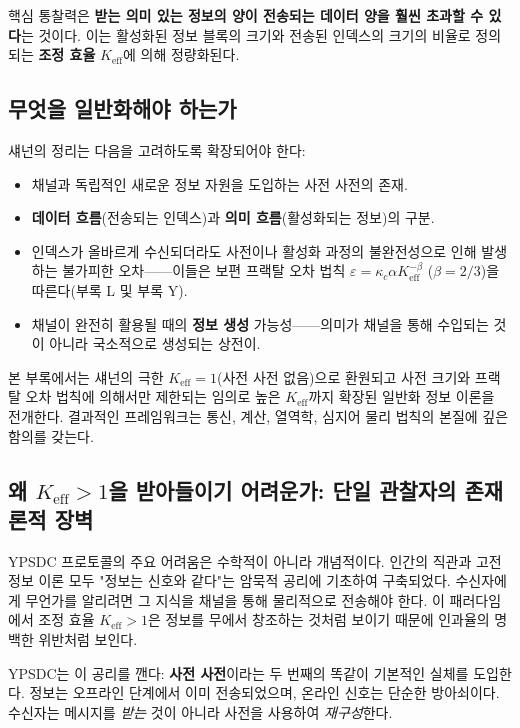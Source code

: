 \documentclass[12pt,a4paper]{article}
\newcommand{\Keff}{K_{\mathrm{eff}}}
\begin{document}
	핵심 통찰력은 \textbf{받는 의미 있는 정보의 양이 전송되는 데이터 양을 훨씬 초과할 수 있다}는 것이다. 이는 활성화된 정보 블록의 크기와 전송된 인덱스의 크기의 비율로 정의되는 \textbf{조정 효율} $\Keff$에 의해 정량화된다.
	
	\subsection{무엇을 일반화해야 하는가}
	
	섀넌의 정리는 다음을 고려하도록 확장되어야 한다:
	\begin{itemize}
		\item 채널과 독립적인 새로운 정보 자원을 도입하는 사전 사전의 존재.
		\item \textbf{데이터 흐름}(전송되는 인덱스)과 \textbf{의미 흐름}(활성화되는 정보)의 구분.
		\item 인덱스가 올바르게 수신되더라도 사전이나 활성화 과정의 불완전성으로 인해 발생하는 불가피한 오차——이들은 보편 프랙탈 오차 법칙 $\varepsilon = \kappa_c\alpha K_{\mathrm{eff}}^{-\beta}$ ($\beta=2/3$)을 따른다(부록 L 및 부록 Y).
		\item 채널이 완전히 활용될 때의 \textbf{정보 생성} 가능성——의미가 채널을 통해 수입되는 것이 아니라 국소적으로 생성되는 상전이.
	\end{itemize}
	
	본 부록에서는 섀넌의 극한 $\Keff = 1$(사전 사전 없음)으로 환원되고 사전 크기와 프랙탈 오차 법칙에 의해서만 제한되는 임의로 높은 $\Keff$까지 확장된 일반화 정보 이론을 전개한다. 결과적인 프레임워크는 통신, 계산, 열역학, 심지어 물리 법칙의 본질에 깊은 함의를 갖는다.
	
	\subsection{왜 \(K_{\mathrm{eff}} > 1\)을 받아들이기 어려운가: 단일 관찰자의 존재론적 장벽}
	
	YPSDC 프로토콜의 주요 어려움은 수학적이 아니라 개념적이다. 인간의 직관과 고전 정보 이론 모두 "정보는 신호와 같다"는 암묵적 공리에 기초하여 구축되었다. 수신자에게 무언가를 알리려면 그 지식을 채널을 통해 물리적으로 전송해야 한다. 이 패러다임에서 조정 효율 \(K_{\mathrm{eff}} > 1\)은 정보를 무에서 창조하는 것처럼 보이기 때문에 인과율의 명백한 위반처럼 보인다.
	
	YPSDC는 이 공리를 깬다: \textbf{사전 사전}이라는 두 번째의 똑같이 기본적인 실체를 도입한다. 정보는 오프라인 단계에서 이미 전송되었으며, 온라인 신호는 단순한 방아쇠이다. 수신자는 메시지를 \emph{받는} 것이 아니라 사전을 사용하여 \emph{재구성}한다.
	
\end{document}
